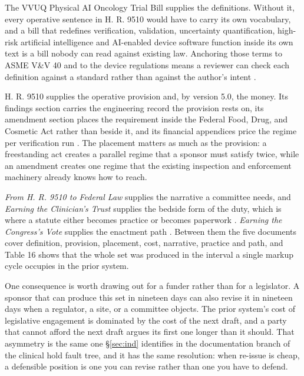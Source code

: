 The VVUQ Physical AI Oncology Trial Bill supplies the definitions. Without it,
every operative sentence in H. R. 9510 would have to carry its own vocabulary,
and a bill that redefines verification, validation, uncertainty quantification,
high-risk artificial intelligence and AI-enabled device software function inside
its own text is a bill nobody can read against existing law. Anchoring those
terms to ASME V\&V 40 and to the device regulations means a reviewer can check
each definition against a standard rather than against the author's intent
\cite{vvuqbill2026, asmevv40}.

H. R. 9510 supplies the operative provision and, by version 5.0, the money. Its
findings section carries the engineering record the provision rests on, its
amendment section places the requirement inside the Federal Food, Drug, and
Cosmetic Act rather than beside it, and its financial appendices price the
regime per verification run \cite{hr9510billv5}. The placement matters as much
as the provision: a freestanding act creates a parallel regime that a sponsor
must satisfy twice, while an amendment creates one regime that the existing
inspection and enforcement machinery already knows how to reach.

\emph{From H. R. 9510 to Federal Law} supplies the narrative a committee needs,
and \emph{Earning the Clinician's Trust} supplies the bedside form of the duty,
which is where a statute either becomes practice or becomes paperwork
\cite{narrativecase2026, clintrust}. \emph{Earning the Congress's Vote} supplies
the enactment path \cite{congressvote}. Between them the five documents cover
definition, provision, placement, cost, narrative, practice and path, and Table
16 shows that the whole set was produced in the interval a single markup cycle
occupies in the prior system.

One consequence is worth drawing out for a funder rather than for a legislator.
A sponsor that can produce this set in nineteen days can also revise it in
nineteen days when a regulator, a site, or a committee objects. The prior
system's cost of legislative engagement is dominated by the cost of the next
draft, and a party that cannot afford the next draft argues its first one
longer than it should. That asymmetry is the same one \S\ref{sec:ind} identifies
in the documentation branch of the clinical hold fault tree, and it has the same
resolution: when re-issue is cheap, a defensible position is one you can revise
rather than one you have to defend.

